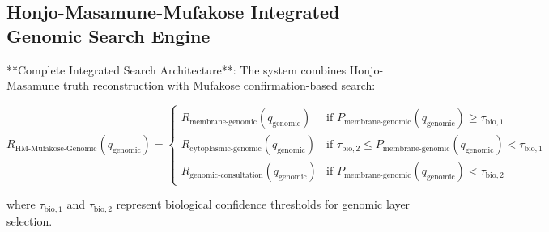 \documentclass[12pt,a4paper]{article}
\begin{document}
\subsection{Honjo-Masamune-Mufakose Integrated Genomic Search Engine}

**Complete Integrated Search Architecture**: The system combines Honjo-Masamune truth reconstruction with Mufakose confirmation-based search:

\begin{equation}
R_{\text{HM-Mufakose-Genomic}}(q_{\text{genomic}}) = \begin{cases}
R_{\text{membrane-genomic}}(q_{\text{genomic}}) & \text{if } P_{\text{membrane-genomic}}(q_{\text{genomic}}) \geq \tau_{\text{bio},1} \\
R_{\text{cytoplasmic-genomic}}(q_{\text{genomic}}) & \text{if } \tau_{\text{bio},2} \leq P_{\text{membrane-genomic}}(q_{\text{genomic}}) < \tau_{\text{bio},1} \\
R_{\text{genomic-consultation}}(q_{\text{genomic}}) & \text{if } P_{\text{membrane-genomic}}(q_{\text{genomic}}) < \tau_{\text{bio},2}
\end{cases}
\end{equation}

where $\tau_{\text{bio},1}$ and $\tau_{\text{bio},2}$ represent biological confidence thresholds for genomic layer selection.
\end{document}
